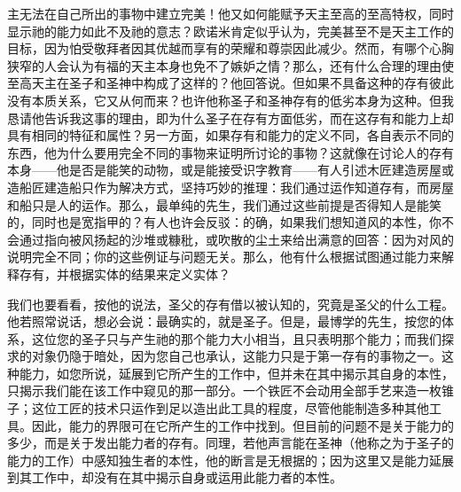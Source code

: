 主无法在自己所出的事物中建立完美！他又如何能赋予天主至高的至高特权，同时显示祂的能力如此不及祂的意志？欧诺米肯定似乎认为，完美甚至不是天主工作的目标，因为怕受敬拜者因其优越而享有的荣耀和尊崇因此减少。然而，有哪个心胸狭窄的人会认为有福的天主本身也免不了嫉妒之情？那么，还有什么合理的理由使至高天主在圣子和圣神中构成了这样的？他回答说。但如果不具备这种的存有彼此没有本质关系，它又从何而来？也许他称圣子和圣神存有的低劣本身为这种。但我恳请他告诉我这事的理由，即为什么圣子在存有方面低劣，而在这存有和能力上却具有相同的特征和属性？另一方面，如果存有和能力的定义不同，各自表示不同的东西，他为什么要用完全不同的事物来证明所讨论的事物？这就像在讨论人的存有本身——他是否是能笑的动物，或是能接受识字教育——有人引述木匠建造房屋或造船匠建造船只作为解决方式，坚持巧妙的推理：我们通过运作知道存有，而房屋和船只是人的运作。那么，最单纯的先生，我们通过这些前提是否得知人是能笑的，同时也是宽指甲的？有人也许会反驳：的确，如果我们想知道风的本性，你不会通过指向被风扬起的沙堆或糠秕，或吹散的尘土来给出满意的回答：因为对风的说明完全不同；你的这些例证与问题无关。那么，他有什么根据试图通过能力来解释存有，并根据实体的结果来定义实体？\par

我们也要看看，按他的说法，圣父的存有借以被认知的，究竟是圣父的什么工程。他若照常说话，想必会说：最确实的，就是圣子。但是，最博学的先生，按您的体系，这位您的圣子只与产生祂的那个能力大小相当，且只表明那个能力；而我们探求的对象仍隐于暗处，因为您自己也承认，这能力只是于第一存有的事物之一。这种能力，如您所说，延展到它所产生的工作中，但并未在其中揭示其自身的本性，只揭示我们能在该工作中窥见的那一部分。一个铁匠不会动用全部手艺来造一枚锥子；这位工匠的技术只运作到足以造出此工具的程度，尽管他能制造多种其他工具。因此，能力的界限可在它所产生的工作中找到。但目前的问题不是关于能力的多少，而是关于发出能力者的存有。同理，若他声言能在圣神（他称之为于圣子的能力的工作）中感知独生者的本性，他的断言是无根据的；因为这里又是能力延展到其工作中，却没有在其中揭示自身或运用此能力者的本性。\par

